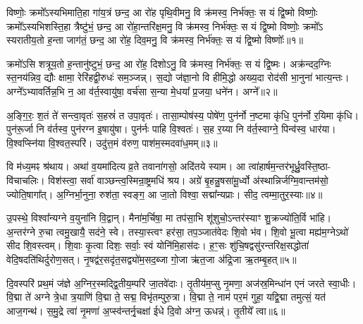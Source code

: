 \setcounter{anuvakam}{0}
विष्णोः॒ क्रमो᳚\-ऽस्यभिमाति॒हा गा॑य॒त्रं छन्द॒ आ रो॑ह पृथि॒वीमनु॒ वि क्र॑मस्व॒ निर्भ॑क्तः॒ स यं द्वि॒ष्मो विष्णोः॒ क्रमो᳚\-ऽस्यभिशस्ति॒हा त्रैष्टु॑भं॒ छन्द॒ आ रो॑हा॒न्तरि॑क्ष॒मनु॒ वि क्र॑मस्व॒ निर्भ॑क्तः॒ स यं द्वि॒ष्मो विष्णोः॒ क्रमो᳚\-ऽ स्यरातीय॒तो ह॒न्ता जाग॑तं॒ छन्द॒ आ रो॑ह॒ दिव॒मनु॒ वि क्र॑मस्व॒ निर्भ॑क्तः॒ स यं द्वि॒ष्मो विष्णोः᳚॥१॥

क्रमो॑\-ऽसि शत्रूय॒तो ह॒न्तानु॑ष्टुभं॒ छन्द॒ आ रो॑ह॒ दिशो\-ऽनु॒ वि क्र॑मस्व॒ निर्भ॑क्तः॒ स यं द्वि॒ष्मः। अक्र॑न्दद॒ग्निः स्त॒नय॑न्निव॒ द्यौः क्षामा॒ रेरि॑हद्वी॒रुधः॑ सम॒ञ्जन्न्। स॒द्यो ज॑ज्ञा॒नो वि हीमि॒द्धो अख्य॒दा रोद॑सी भा॒नुना॑ भात्य॒न्तः। अग्ने᳚\-ऽभ्यावर्तिन्न॒भि न॒ आ व॑र्त॒स्वायु॑षा॒ वर्च॑सा स॒न्या मे॒धया᳚ प्र॒जया॒ धने॑न। अग्ने᳚॥२॥

अ॒ङ्गि॒रः॒ श॒तं ते॑ सन्त्वा॒वृतः॑ स॒हस्रं॑ त उपा॒वृतः॑। तासा॒म्पोष॑स्य॒ पोषे॑ण॒ पुन॑र्नो न॒ष्टमा कृ॑धि॒ पुन॑र्नो र॒यिमा कृ॑धि। पुन॑रू॒र्जा नि व॑र्तस्व॒ पुन॑रग्न इ॒षायु॑षा। पुन॑र्नः पाहि वि॒श्वतः॑। स॒ह र॒य्या नि व॑र्त॒स्वाग्ने॒ पिन्व॑स्व॒ धार॑या। वि॒श्वप्स्नि॑या वि॒श्वत॒स्परि॑। उदु॑त्त॒मं व॑रुण॒ पाश॑म॒स्मदवा॑ध॒मम्॥३॥

वि म॑ध्य॒मꣴ श्र॑थाय। अथा॑ व॒यमा॑दित्य व्र॒ते तवाना॑गसो॒ अदि॑तये स्याम। आ त्वा॑हार्\mbox{}षम॒न्तर॑भूर्ध्रु॒वस्ति॒ष्ठा- वि॑चाचलिः। विश॑स्त्वा॒ सर्वा॑ वाञ्छन्त्व॒स्मिन्रा॒ष्ट्रमधि॑ श्रय। अग्रे॑ बृ॒हन्नु॒षसा॑मू॒र्ध्वो अ॑स्थान्निर्जग्मि॒वान्तम॑सो॒ ज्योति॒षागा᳚त्। अ॒ग्निर्भा॒नुना॒ रुश॑ता॒ स्वङ्ग॒ आ जा॒तो विश्वा॒ सद्मा᳚न्यप्राः। सीद॒ त्वम्मा॒तुर॒स्याः॥४॥

उ॒पस्थे॒ विश्वा᳚न्यग्ने व॒युना॑नि वि॒द्वान्। मैना॑म॒र्चिषा॒ मा तप॑सा॒भि शू॑शुचो॒\-ऽन्तर॑स्याꣳ शु॒क्रज्यो॑ति॒र्वि भा॑हि। अ॒न्तर॑ग्ने रु॒चा त्वमु॒खायै॒ सद॑ने॒ स्वे। तस्या॒स्त्वꣳ हर॑सा॒ तप॒ञ्जात॑वेदः शि॒वो भ॑व। शि॒वो भू॒त्वा मह्य॑म॒ग्ने\-ऽथो॑ सीद शि॒वस्त्वम्। शि॒वाः कृ॒त्वा दिशः॒ सर्वाः॒ स्वं योनि॑मि॒हास॑दः। ह॒ꣳ॒सः शु॑चि॒षद्वसु॑रन्तरिक्ष॒सद्धोता॑ वेदि॒षदति॑थिर्दुरोण॒सत्। नृ॒षद्व॑र॒सदृ॑त॒सद्व्यो॑म॒सद॒ब्जा गो॒जा ऋ॑त॒जा अ॑द्रि॒जा ऋ॒तम्बृ॒हत्॥५॥

{\anuvakamend[{दिव॒मनु॒ वि क्र॑मस्व॒ निर्भ॑क्तः॒ स यं द्वि॒ष्मो विष्णो॒र्धने॒नाग्ने॑\-ऽध॒मम॒स्याः शु॑चि॒षथ्षोड॑श च॥१॥}]}

दि॒वस्परि॑ प्रथ॒मं ज॑ज्ञे अ॒ग्निर॒स्मद्द्वि॒तीय॒म्परि॑ जा॒तवे॑दाः। तृ॒तीय॑म॒प्सु नृ॒मणा॒ अज॑स्र॒मिन्धा॑न एनं जरते स्वा॒धीः। वि॒द्मा ते॑ अग्ने त्रे॒धा त्र॒याणि॑ वि॒द्मा ते॒ सद्म॒ विभृ॑तम्पुरु॒त्रा। वि॒द्मा ते॒ नाम॑ पर॒मं गुहा॒ यद्वि॒द्मा तमुत्सं॒ यत॑ आज॒गन्थ॑। स॒मु॒द्रे त्वा॑ नृ॒मणा॑ अ॒प्स्व॑न्तर्नृ॒चक्षा॑ ईधे दि॒वो अ॑ग्न॒ ऊधन्न्॑। तृ॒तीये᳚ त्वा॥६॥

